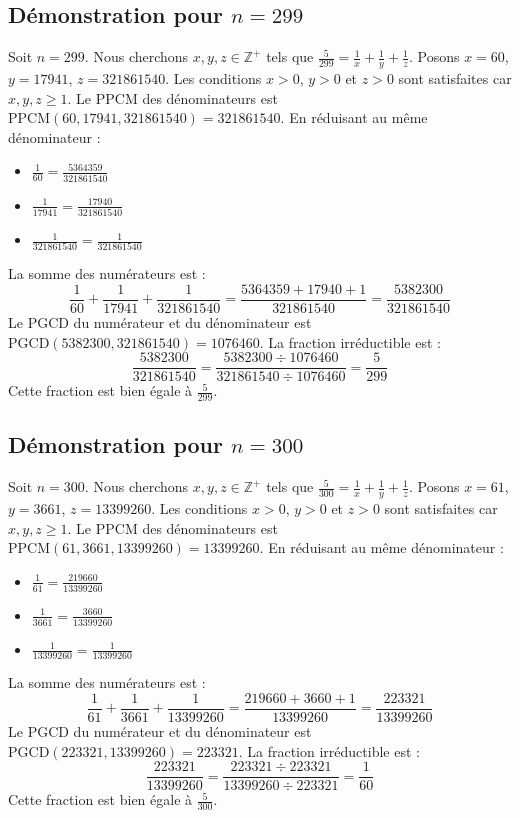 \documentclass[11pt,a4paper]{article}
\begin{document}
\subsection{Démonstration pour $n = 299$}
Soit $n = 299$. Nous cherchons $x, y, z \in \mathbb{Z}^{+}$ tels que $\frac{5}{299} = \frac{1}{x} + \frac{1}{y} + \frac{1}{z}$.
Posons $x = 60$, $y = 17941$, $z = 321861540$.
Les conditions $x > 0$, $y > 0$ et $z > 0$ sont satisfaites car $x, y, z \geq 1$.
Le PPCM des dénominateurs est $\text{PPCM}(60, 17941, 321861540) = 321861540$.
En réduisant au même dénominateur :
\begin{itemize}
    \item $\frac{1}{60} = \frac{5364359}{321861540}$
    \item $\frac{1}{17941} = \frac{17940}{321861540}$
    \item $\frac{1}{321861540} = \frac{1}{321861540}$
\end{itemize}
La somme des numérateurs est :
$$ \frac{1}{60} + \frac{1}{17941} + \frac{1}{321861540} = \frac{5364359 + 17940 + 1}{321861540} = \frac{5382300}{321861540} $$
Le PGCD du numérateur et du dénominateur est $\text{PGCD}(5382300, 321861540) = 1076460$.
La fraction irréductible est :
$$ \frac{5382300}{321861540} = \frac{5382300 \div 1076460}{321861540 \div 1076460} = \frac{5}{299} $$
Cette fraction est bien égale à $\frac{5}{299}$.

\subsection{Démonstration pour $n = 300$}
Soit $n = 300$. Nous cherchons $x, y, z \in \mathbb{Z}^{+}$ tels que $\frac{5}{300} = \frac{1}{x} + \frac{1}{y} + \frac{1}{z}$.
Posons $x = 61$, $y = 3661$, $z = 13399260$.
Les conditions $x > 0$, $y > 0$ et $z > 0$ sont satisfaites car $x, y, z \geq 1$.
Le PPCM des dénominateurs est $\text{PPCM}(61, 3661, 13399260) = 13399260$.
En réduisant au même dénominateur :
\begin{itemize}
    \item $\frac{1}{61} = \frac{219660}{13399260}$
    \item $\frac{1}{3661} = \frac{3660}{13399260}$
    \item $\frac{1}{13399260} = \frac{1}{13399260}$
\end{itemize}
La somme des numérateurs est :
$$ \frac{1}{61} + \frac{1}{3661} + \frac{1}{13399260} = \frac{219660 + 3660 + 1}{13399260} = \frac{223321}{13399260} $$
Le PGCD du numérateur et du dénominateur est $\text{PGCD}(223321, 13399260) = 223321$.
La fraction irréductible est :
$$ \frac{223321}{13399260} = \frac{223321 \div 223321}{13399260 \div 223321} = \frac{1}{60} $$
Cette fraction est bien égale à $\frac{5}{300}$.
\end{document}
